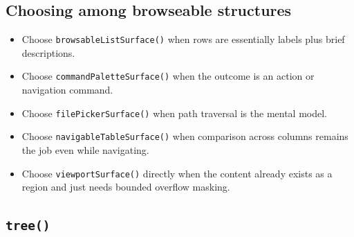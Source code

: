\subsection{Choosing among browseable structures}\label{record-023-choosing-among-browseable-structures}

\begin{itemize}
\tightlist
\item
  Choose \texttt{b\allowbreak{}r\allowbreak{}o\allowbreak{}w\allowbreak{}s\allowbreak{}a\allowbreak{}b\allowbreak{}l\allowbreak{}e\allowbreak{}L\allowbreak{}i\allowbreak{}s\allowbreak{}t\allowbreak{}S\allowbreak{}u\allowbreak{}r\allowbreak{}f\allowbreak{}a\allowbreak{}c\allowbreak{}e\allowbreak{}(\allowbreak{})} when rows are essentially labels plus brief descriptions.
\item
  Choose \texttt{c\allowbreak{}o\allowbreak{}m\allowbreak{}m\allowbreak{}a\allowbreak{}n\allowbreak{}d\allowbreak{}P\allowbreak{}a\allowbreak{}l\allowbreak{}e\allowbreak{}t\allowbreak{}t\allowbreak{}e\allowbreak{}S\allowbreak{}u\allowbreak{}r\allowbreak{}f\allowbreak{}a\allowbreak{}c\allowbreak{}e\allowbreak{}(\allowbreak{})} when the outcome is an action or navigation command.
\item
  Choose \texttt{f\allowbreak{}i\allowbreak{}l\allowbreak{}e\allowbreak{}P\allowbreak{}i\allowbreak{}c\allowbreak{}k\allowbreak{}e\allowbreak{}r\allowbreak{}S\allowbreak{}u\allowbreak{}r\allowbreak{}f\allowbreak{}a\allowbreak{}c\allowbreak{}e\allowbreak{}(\allowbreak{})} when path traversal is the mental model.
\item
  Choose \texttt{n\allowbreak{}a\allowbreak{}v\allowbreak{}i\allowbreak{}g\allowbreak{}a\allowbreak{}b\allowbreak{}l\allowbreak{}e\allowbreak{}T\allowbreak{}a\allowbreak{}b\allowbreak{}l\allowbreak{}e\allowbreak{}S\allowbreak{}u\allowbreak{}r\allowbreak{}f\allowbreak{}a\allowbreak{}c\allowbreak{}e\allowbreak{}(\allowbreak{})} when comparison across columns remains the job even while navigating.
\item
  Choose \texttt{v\allowbreak{}i\allowbreak{}e\allowbreak{}w\allowbreak{}p\allowbreak{}o\allowbreak{}r\allowbreak{}t\allowbreak{}S\allowbreak{}u\allowbreak{}r\allowbreak{}f\allowbreak{}a\allowbreak{}c\allowbreak{}e\allowbreak{}(\allowbreak{})} directly when the content already exists as a region and just needs bounded overflow masking.
\end{itemize}

\subsection{\texorpdfstring{\texttt{t\allowbreak{}r\allowbreak{}e\allowbreak{}e\allowbreak{}(\allowbreak{})}}{}}\label{record-023-tree}


